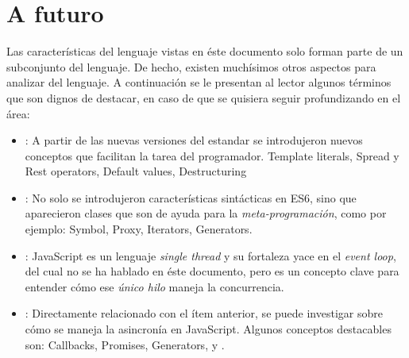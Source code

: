 \section{A futuro}

Las características del lenguaje vistas en éste documento solo forman parte de un subconjunto del lenguaje. De hecho, existen muchísimos otros aspectos para analizar del lenguaje. A continuación se le presentan al lector algunos términos que son dignos de destacar, en caso de que se quisiera seguir profundizando en el área:

\begin{itemize}
\item {}: A partir de las nuevas versiones del estandar se introdujeron nuevos conceptos que facilitan la tarea del programador. Template literals, Spread y Rest operators, Default values, Destructuring
\item {}: No solo se introdujeron características sintácticas en ES6, sino que aparecieron clases que son de ayuda para la \textit{meta-programación}, como por ejemplo: Symbol, Proxy, Iterators, Generators.
\item {}: JavaScript es un lenguaje \textit{single thread} y su fortaleza yace en el \textit{event loop}, del cual no se ha hablado en éste documento, pero es un concepto clave para entender cómo ese \textit{único hilo} maneja la concurrencia.
\item {}: Directamente relacionado con el ítem anterior, se puede investigar sobre cómo se maneja la asincronía en JavaScript. Algunos conceptos destacables son: Callbacks, Promises, Generators,  y .
\end{itemize}